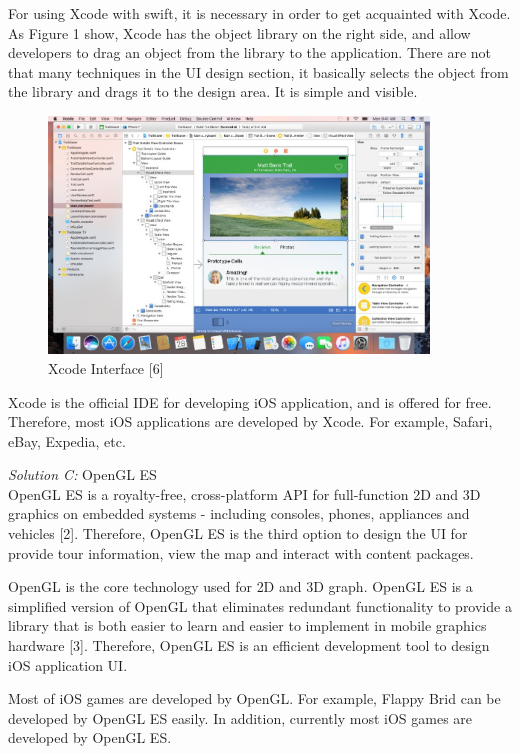 \documentclass[letterpaper, 10pt,titlepage]{article}
\begin{document}
For using Xcode with swift, it is necessary in order to get acquainted with Xcode. As Figure 1 show, Xcode has the object library on the right side, and allow developers to drag an object from the library to the application. There are not that many techniques in the UI design section, it basically selects the object from the library and drags it to the design area. It is simple and visible.

\begin{figure}[ht]
    \centering
    \includegraphics[width=0.9\textwidth]{j1}
    \caption{Xcode Interface [6]}
    \label{jiawei1}
\end{figure}

Xcode is the official IDE for developing iOS application, and is offered for free. Therefore, most iOS applications are developed by Xcode. For example, Safari, eBay, Expedia, etc.


\textit{Solution C:} OpenGL ES\\
OpenGL ES is a royalty-free, cross-platform API for full-function 2D and 3D graphics on embedded systems - including consoles, phones, appliances and vehicles [2]. Therefore, OpenGL ES is the third option to design the UI for provide tour information, view the map and interact with content packages. 


OpenGL is the core technology used for 2D and 3D graph. OpenGL ES is a simplified version of OpenGL that eliminates redundant functionality to provide a library that is both easier to learn and easier to implement in mobile graphics hardware [3]. Therefore, OpenGL ES is an efficient development tool to design iOS application UI. 


Most of iOS games are developed by OpenGL. For example, Flappy Brid can be developed by OpenGL ES easily. In addition, currently most iOS games are developed by OpenGL ES.
\end{document}
